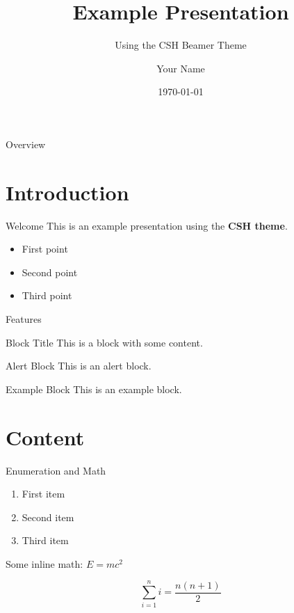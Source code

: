 \documentclass[aspectratio=169]{beamer}
\title{Example Presentation}
\subtitle{Using the CSH Beamer Theme}
\author{Your Name}
\institute{Complexity Science Hub}
\date{\today}
\begin{document}
\begin{frame}
    \titlepage
\end{frame}

\begin{frame}{Overview}
    \tableofcontents
\end{frame}

\section{Introduction}

\begin{frame}{Welcome}
    This is an example presentation using the \textbf{CSH theme}.

    \begin{itemize}
        \item First point
        \item Second point
        \item Third point
    \end{itemize}
\end{frame}

\begin{frame}{Features}
    \begin{block}{Block Title}
        This is a block with some content.
    \end{block}

    \begin{alertblock}{Alert Block}
        This is an alert block.
    \end{alertblock}

    \begin{exampleblock}{Example Block}
        This is an example block.
    \end{exampleblock}
\end{frame}

\section{Content}

\begin{frame}{Enumeration and Math}
    \begin{enumerate}
        \item First item
        \item Second item
        \item Third item
    \end{enumerate}

    \vspace{1em}

    Some inline math: $E = mc^2$

    \[
        \sum_{i=1}^{n} i = \frac{n(n+1)}{2}
    \]
\end{frame}
\end{document}
